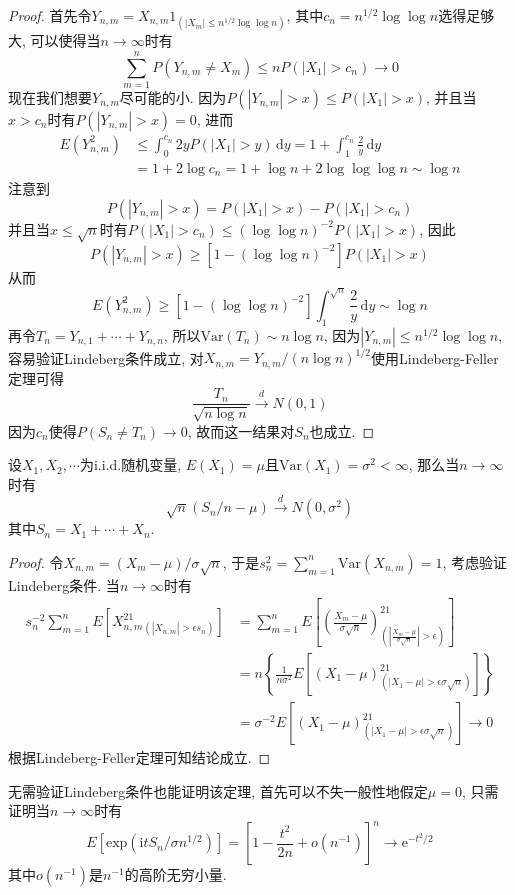 \documentclass[cn, 12pt, math=mtpro2, bibstyle=apa, blue, twocol]{elegantbook}
\begin{document}
\begin{proof}
  首先令$Y_{n,m}=X_{n,m}1_{(|X_m|\leq n^{1/2}\log\log n)}$, 其中$c_n=n^{1/2}\log\log n$选得足够大, 可以使得当$n\to\infty$时有
  $$\sum_{m=1}^{n}P(Y_{n,m}\neq X_m)\leq nP(|X_1|>c_n)\to 0$$
  现在我们想要$Y_{n,m}$尽可能的小. 因为$P(|Y_{n,m}|>x)\leq P(|X_1|>x)$, 并且当$x>c_n$时有$P(|Y_{n,m}|>x)=0$, 进而
  \begin{align*}
  E(Y_{n,m}^2)&\leq \int_{0}^{c_n}2yP(|X_1|>y)\,\text{d}y=1+\int_{1}^{c_n}\frac{2}{y}\,\text{d}y \\
  &=1+2\log c_n=1+\log n+2\log\log\log n\sim \log n
  \end{align*}
  注意到
  $$P(|Y_{n,m}|>x)=P(|X_1|>x)-P(|X_1|>c_n)$$
  并且当$x\leq \sqrt{n}$时有$P(|X_1|>c_n)\leq (\log\log n)^{-2}P(|X_1|>x)$, 因此
  $$P(|Y_{n,m}|>x)\geq [1-(\log\log n)^{-2}]P(|X_1|>x)$$
  从而
  $$E(Y_{n,m}^2)\geq [1-(\log\log n)^{-2}]\int_{1}^{\sqrt{n}}\frac{2}{y}\,\text{d}y \sim \log n$$
  再令$T_n=Y_{n,1}+\cdots+Y_{n,n}$, 所以$\text{Var}(T_n)\sim n\log n$, 因为$|Y_{n,m}|\leq n^{1/2}\log\log n$, 容易验证Lindeberg条件成立, 对$X_{n,m}=Y_{n,m}/(n\log n)^{1/2}$使用Lindeberg-Feller定理可得
  $$\frac{T_n}{\sqrt{n\log n}}\xrightarrow{d} N(0,1)$$
  因为$c_n$使得$P(S_n\neq T_n)\to 0$, 故而这一结果对$S_n$也成立.
\end{proof}

\begin{theorem}
  设$X_1,X_2,\cdots$为i.i.d.随机变量, $E(X_1)=\mu$且$\text{Var}(X_1)=\sigma^2<\infty$, 那么当$n\to\infty$时有
  $$\sqrt{n}(S_n/n-\mu)\xrightarrow{d}N(0,\sigma^2)$$
  其中$S_n=X_1+\cdots+X_n$.
\end{theorem}
\begin{proof}
  令$X_{n,m}=(X_m-\mu)/\sigma\sqrt{n}$, 于是$s_n^2=\sum_{m=1}^{n}\text{Var}(X_{n,m})=1$, 考虑验证Lindeberg条件. 当$n\to\infty$时有
  \begin{align*}
  s_n^{-2}\sum_{m=1}^{n}E[X_{n,m}^21_{(|X_{n,m}|>\epsilon s_n)}]&=\sum_{m=1}^{n}E\left[\left(\frac{X_m-\mu}{\sigma\sqrt{n}}\right)^21_{\left(\left|\frac{X_m-\mu}{\sigma\sqrt{n}}\right|>\epsilon\right)}\right] \\
  &=n\left\{\frac{1}{n\sigma^2}E[(X_1-\mu)^21_{(|X_1-\mu|>\epsilon\sigma\sqrt{n})}]\right\} \\
  &=\sigma^{-2}E[(X_1-\mu)^21_{(|X_1-\mu|>\epsilon\sigma\sqrt{n})}] \to0
  \end{align*}
  根据Lindeberg-Feller定理可知结论成立.
\end{proof}
\begin{remark}
无需验证Lindeberg条件也能证明该定理, 首先可以不失一般性地假定$\mu=0$, 只需证明当$n\to\infty$时有
$$E[\text{exp}(\text{i}tS_n/\sigma n^{1/2})]=\left[1-\frac{t^2}{2n}+o(n^{-1})\right]^n\to \text{e}^{-t^2/2}$$
其中$o(n^{-1})$是$n^{-1}$的高阶无穷小量.
\end{remark}
\end{document}
